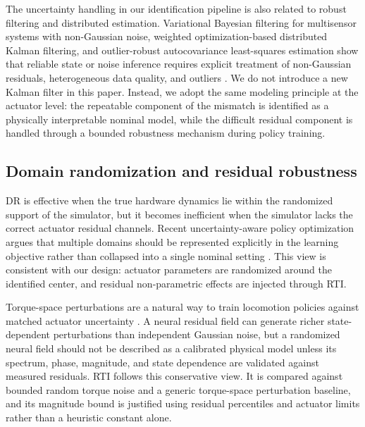 \documentclass[twoside,final,1p,times]{elsarticle}
\newcommand{\rev}[1]{#1}
\newcommand{\minorrev}[1]{#1}
\newenvironment{revblock}{}{}
\begin{document}
\begin{revblock}
The uncertainty handling in our identification pipeline is also related to robust filtering and distributed estimation. Variational Bayesian filtering for multisensor systems with non-Gaussian noise, weighted optimization-based distributed Kalman filtering, and outlier-robust autocovariance least-squares estimation show that reliable state or noise inference requires explicit treatment of non-Gaussian residuals, heterogeneous data quality, and outliers \minorrev{\citep{li2019fast,chen2017weighted,li2026alsirls}}. We do not introduce a new Kalman filter in this paper. Instead, we adopt the same modeling principle at the actuator level: the repeatable component of the mismatch is identified as a physically interpretable nominal model, while the difficult residual component is handled through a bounded robustness mechanism during policy training.
\end{revblock}

\subsection{Domain randomization and residual robustness}
DR is effective when the true hardware dynamics lie within the randomized support of the simulator, but it becomes inefficient when the simulator lacks the correct actuator residual channels. Recent uncertainty-aware policy optimization argues that multiple domains should be represented explicitly in the learning objective rather than collapsed into a single nominal setting \minorrev{\citep{ilboudo2026domains}}. This view is consistent with our design: actuator parameters are randomized around the identified center, and residual non-parametric effects are injected through RTI.

Torque-space perturbations are a natural way to train locomotion policies against matched actuator uncertainty \minorrev{\citep{pinto2017robust}}. A neural residual field can generate richer state-dependent perturbations than independent Gaussian noise, but a randomized neural field should not be described as a calibrated physical model unless its spectrum, phase, magnitude, and state dependence are validated against measured residuals. \rev{RTI follows this conservative view. It is compared against bounded random torque noise and a generic torque-space perturbation baseline, and its magnitude bound is justified using residual percentiles and actuator limits rather than a heuristic constant alone.}
\end{document}
